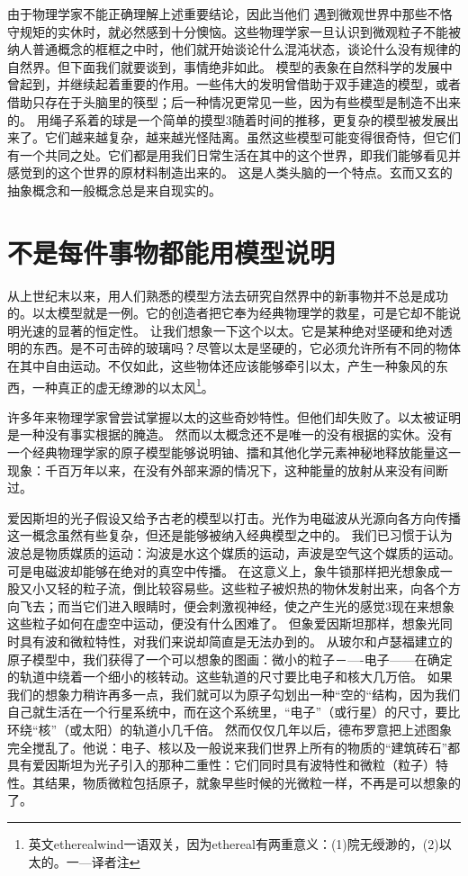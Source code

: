 由于物理学家不能正确理解上述重要结论，因此当他们
遇到微观世界中那些不恪守规矩的实休时，就必然感到十分懊恼。这些物理学家一旦认识到微观粒子不能被纳人普通概念的框框之中时，他们就开始谈论什么混沌状态，谈论什么没有规律的自然界。但下面我们就要谈到，事情绝非如此。
模型的表象在自然科学的发展中曾起到，并继续起着重要的作用。一些伟大的发明曾借助于双手建造的模型，或者借助只存在于头脑里的筷型；后一种情况更常见一些，因为有些模型是制造不出来的。
用绳子系着的球是一个简单的摸型3随着时间的推移，更复杂的模型被发展出来了。它们越来越复杂，越来越光怪陆离。虽然这些模型可能变得很奇恃，但它们有一个共同之处。它们都是用我们日常生活在其中的这个世界，即我们能够看见并感觉到的这个世界的原材料制造出来的。
这是人类头脑的一个特点。玄而又玄的抽象概念和一般概念总是来自现实的。

\section{不是每件事物都能用模型说明}

从上世纪末以来，用人们熟悉的模型方法去研究自然界中的新事物并不总是成功的。以太模型就是一例。它的创造者把它奉为经典物理学的救星，可是它却不能说明光速的显著的恒定性。
让我们想象一下这个以太。它是某种绝对坚硬和绝对透明的东西。是不可击碎的玻璃吗？尽管以太是坚硬的，它必须允许所有不同的物体在其中自由运动。不仅如此，这些物体还应该能够牵引以太，产生一种象风的东西，一种真正的虚无缭渺的以太风\footnote{英文etherealwind一语双关，因为ethereal有两重意义：(1)院无绶渺的，(2)以太的。一—译者注}。

许多年来物理学家曾尝试掌握以太的这些奇妙特性。但他们却失败了。以太被证明是一种没有事实根据的腌造。
然而以太概念还不是唯一的没有根据的实休。没有一个经典物理学家的原子模型能够说明铀、擂和其他化学元素神秘地释放能量这一现象：千百万年以来，在没有外部来源的情况下，这种能量的放射从来没有间断过。

爱因斯坦的光子假设又给予古老的模型以打击。光作为电磁波从光源向各方向传播这一概念虽然有些复杂，但还是能够被纳入经典模型之中的。
我们已习惯于认为波总是物质媒质的运动：沟波是水这个媒质的运动，声波是空气这个媒质的运动。可是电磁波却能够在绝对的真空中传播。
在这意义上，象牛锁那样把光想象成一股又小又轻的粒子流，倒比较容易些。这些粒子被炽热的物休发射出来，向各个方向飞去；而当它们进入眼睛时，便会刺激视神经，使之产生光的感觉3现在来想象这些粒子如何在虚空中运动，便没有什么困难了。
但象爱因斯坦那样，想象光同时具有波和微粒特性，对我们来说却简直是无法办到的。
从玻尔和卢瑟福建立的原子模型中，我们获得了一个可以想象的图画：微小的粒子－—-电子——在确定的轨道中绕着一个细小的核转动。这些轨道的尺寸要比电子和核大几万倍。
如果我们的想象力稍许再多一点，我们就可以为原子勾划出一种“空的“结构，因为我们自己就生活在一个行星系统中，而在这个系统里，“电子”（或行星）的尺寸，要比环绕“核”（或太阳）的轨道小几千倍。
然而仅仅几年以后，德布罗意把上述图象完全搅乱了。他说：电子、核以及一般说来我们世界上所有的物质的“建筑砖石”都具有爱因斯坦为光子引入的那种二重性：它们同时具有波特性和微粒（粒子）特性。其结果，物质微粒包括原子，就象早些时候的光微粒一样，不再是可以想象的了。

